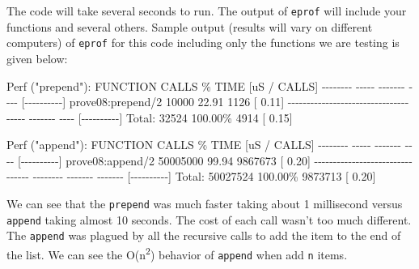 \documentclass[
]{book}
\newenvironment{Shaded}{\begin{snugshade}}{\end{snugshade}}
\newcommand{\NormalTok}[1]{#1}
\begin{document}
The code will take several seconds to run. The output of \texttt{eprof} will include your functions and several others. Sample output (results will vary on different computers) of \texttt{eprof} for this code including only the functions we are testing is given below:

\begin{Shaded}
\begin{Highlighting}[]
\NormalTok{Perf ("prepend"):}
\NormalTok{FUNCTION                          CALLS        \%  TIME  [uS / CALLS]}
\NormalTok{{-}{-}{-}{-}{-}{-}{-}{-}                          {-}{-}{-}{-}{-}  {-}{-}{-}{-}{-}{-}{-}  {-}{-}{-}{-}  [{-}{-}{-}{-}{-}{-}{-}{-}{-}{-}]}
\NormalTok{prove08:prepend/2                 10000    22.91  1126  [      0.11]}
\NormalTok{{-}{-}{-}{-}{-}{-}{-}{-}{-}{-}{-}{-}{-}{-}{-}{-}{-}{-}{-}{-}{-}{-}{-}{-}{-}{-}{-}{-}{-}{-}{-}{-}  {-}{-}{-}{-}{-}  {-}{-}{-}{-}{-}{-}{-}  {-}{-}{-}{-}  [{-}{-}{-}{-}{-}{-}{-}{-}{-}{-}]}
\NormalTok{Total:                            32524  100.00\%  4914  [      0.15]}

\NormalTok{Perf ("append"): }
\NormalTok{FUNCTION                             CALLS        \%     TIME  [uS / CALLS]}
\NormalTok{{-}{-}{-}{-}{-}{-}{-}{-}                             {-}{-}{-}{-}{-}  {-}{-}{-}{-}{-}{-}{-}     {-}{-}{-}{-}  [{-}{-}{-}{-}{-}{-}{-}{-}{-}{-}]}
\NormalTok{prove08:append/2                  50005000    99.94  9867673  [      0.20]}
\NormalTok{{-}{-}{-}{-}{-}{-}{-}{-}{-}{-}{-}{-}{-}{-}{-}{-}{-}{-}{-}{-}{-}{-}{-}{-}{-}{-}{-}{-}{-}{-}{-}{-}  {-}{-}{-}{-}{-}{-}{-}{-}  {-}{-}{-}{-}{-}{-}{-}  {-}{-}{-}{-}{-}{-}{-}  [{-}{-}{-}{-}{-}{-}{-}{-}{-}{-}]}
\NormalTok{Total:                            50027524  100.00\%  9873713  [      0.20]}
\end{Highlighting}
\end{Shaded}

We can see that the \texttt{prepend} was much faster taking about 1 millisecond versus \texttt{append} taking almost 10 seconds. The cost of each call wasn't too much different. The \texttt{append} was plagued by all the recursive calls to add the item to the end of the list. We can see the O(n\textsuperscript{2}) behavior of \texttt{append} when add \texttt{n} items.
\end{document}
